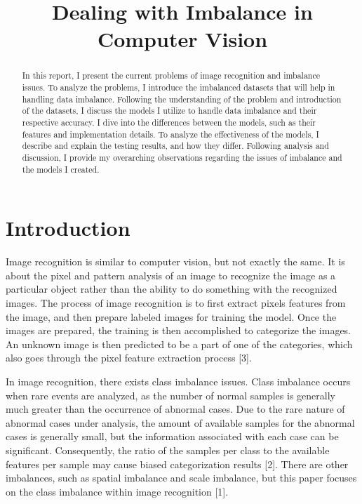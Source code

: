 \documentclass[conference]{IEEEtran}
\begin{document}
\title{Dealing with Imbalance in Computer Vision\\}

\author{
}

\maketitle

\begin{abstract}
    In this report, I present the current problems of image recognition and imbalance issues. To analyze the problems, I introduce the imbalanced datasets that will help in handling data imbalance. Following the understanding of the problem and introduction of the datasets, I discuss the models I utilize to handle data imbalance and their respective accuracy. I dive into the differences between the models, such as their features and implementation details. To analyze the effectiveness of the models, I describe and explain the testing results, and how they differ. Following analysis and discussion, I provide my overarching observations regarding the issues of imbalance and the models I created. 
\end{abstract}

\section{Introduction}
Image recognition is similar to computer vision, but not exactly the same. It is about the pixel and pattern analysis of an image to recognize the image as a particular object rather than the ability to do something with the recognized images. The process of image recognition is to first extract pixels features from the image, and then prepare labeled images for training the model. Once the images are prepared, the training is then accomplished to categorize the images. An unknown image is then predicted to be a part of one of the categories, which also goes through the pixel feature extraction process [3]. 

In image recognition, there exists class imbalance issues. Class imbalance occurs when rare events are analyzed, as the number of normal samples is generally much greater than the occurrence of abnormal cases. Due to the rare nature of abnormal cases under analysis, the amount of available samples for the abnormal cases is generally small, but the information associated with each case can be significant. Consequently, the ratio of the samples per class to the available features per sample may cause biased categorization results [2]. There are other imbalances, such as spatial imbalance and scale imbalance, but this paper focuses on the class imbalance within image recognition [1].
\end{document}
